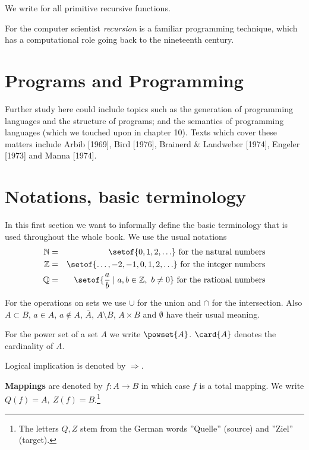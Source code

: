 We write \prim for all primitive recursive functions.

For the computer scientist \emph{recursion} is a familiar programming technique, which has a computational role going back to the nineteenth century. 




\section{Programs and Programming} 

Further study here could include 
topics such as the generation of programming languages and the structure 
of programs; and the semantics of programming languages (which we 
touched upon in chapter 10). Texts which cover these matters include 
Arbib [1969], Bird [1976], Brainerd \& Landweber [1974], Engeler 
[1973] and Manna [1974]. 



\section{Notations, basic terminology}

In this first section we want to informally define the basic terminology that is
used throughout the whole book. We use the usual notations
\begin{eqnarray*}
\mathbb{N} &=& \setof{0, 1, 2, \ldots}\text{ for the natural numbers} \\
\mathbb{Z} &=& \setof{\ldots, -2, -1, 0, 1, 2, \ldots}\text{ for the integer
numbers} \\
\mathbb{Q} &=& \setof{\frac{a}{b} \mid a,b \in \mathbb{Z},\ b \neq 0}\text{
for the rational numbers}
\end{eqnarray*}

For the operations on sets we use $\cup$ for the union and $\cap$ for the
intersection. Also $A \subset B$, $a \in A$, $a \not\in A$, $\bar{A}$, $A
\setminus B$, $A \times B$ and $\emptyset$ have their usual meaning.

For the power set of a set $A$ we write $\powset{A}$. $\card{A}$ denotes
the cardinality of $A$.

Logical implication is denoted by $\Rightarrow$.

{\bf Mappings} are denoted by $f : A \to B$ in which case $f$ is a
total mapping. We write $Q(f) = A,\ Z(f) = B$.\footnote{The letters $Q, Z$ stem 
from the German words ''Quelle'' (source) and ''Ziel'' (target).}

